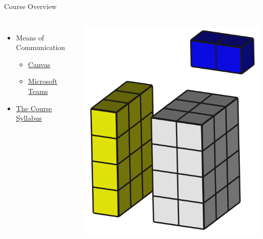 \documentclass[handout]{beamer}
\begin{document}
\begin{frame}{Course Overview}
    \begin{columns}
    \begin{itemize}
        \item Means of Communication
        \begin{itemize}
            \item \href{https://semo.instructure.com/courses/8742}{Canvas}
            \item \href{https://teams.microsoft.com/l/team/19\%3aUpB3PjqRhBNybZmelVdPRJ8Y9d_-qosJxCWbuxIsaVE1\%40thread.tacv2/conversations?groupId=bd2ac44b-b270-4b10-8140-7708728805a9&tenantId=19d57598-97b0-442c-b74e-c855b0d87caf}{Microsoft Teams}
        \end{itemize}
        \item \href{https://semo.instructure.com/courses/8742/assignments/syllabus}{The Course Syllabus}
    \end{itemize}
    
    \includegraphics[max width=\textwidth]{images/tensor}
    \end{columns}
\end{frame}
\end{document}
